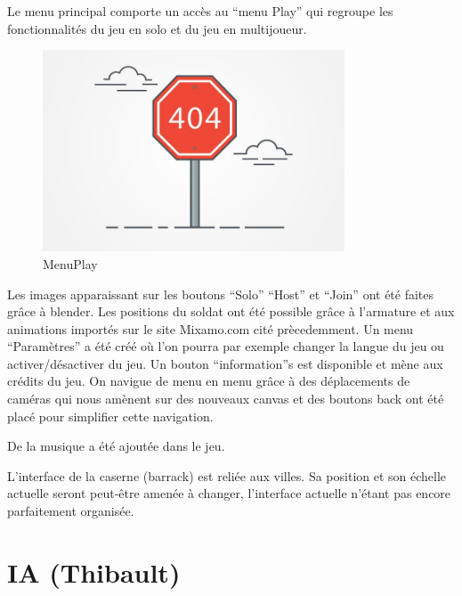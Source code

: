 \documentclass[12pt]{report}
\begin{document}
Le menu principal comporte un accès au “menu Play” qui regroupe les
fonctionnalités du jeu en solo et du jeu en multijoueur.

\begin{figure}[H]
    \centering
    \includegraphics[width=0.8\textwidth]{404}
    \caption{MenuPlay}
\end{figure}

Les images apparaissant sur les boutons “Solo” “Host” et “Join” ont été faites
grâce à blender. Les positions du soldat ont été possible grâce à l’armature
et aux animations importés sur le site Mixamo.com cité prècedemment. Un menu
“Paramètres” a été créé où l’on pourra par exemple changer la langue du jeu ou
activer/désactiver du jeu. Un bouton “information”s est disponible et mène aux
crédits du jeu.  On navigue de menu en menu grâce à des déplacements de
caméras qui nous amènent sur des nouveaux canvas et des boutons back ont été
placé pour simplifier cette navigation.


De la musique a été ajoutée dans le jeu.

L’interface de la caserne (barrack) est reliée aux villes. Sa position et son
échelle actuelle seront peut-être amenée à changer, l’interface actuelle
n’étant pas encore parfaitement organisée. 

\section{IA (Thibault)}
\end{document}
